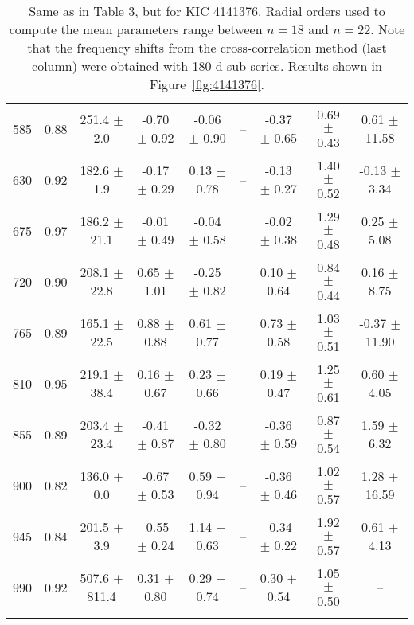 \documentclass[twocolumn]{aastex61}%
\begin{document}
\begin{table*}[ht]
\begin{tabular}{ccc|ccccc|c}
585 & 0.88 & 251.4 $\pm$ 2.0 & -0.70 $\pm$ 0.92 & -0.06 $\pm$ 0.90 & -- & -0.37 $\pm$ 0.65 & 0.69 $\pm$ 0.43 & 0.61 $\pm$ 11.58\\
630 & 0.92 & 182.6 $\pm$ 1.9 & -0.17 $\pm$ 0.29 & 0.13 $\pm$ 0.78 & -- & -0.13 $\pm$ 0.27 & 1.40 $\pm$ 0.52 & -0.13 $\pm$ 3.34\\
675 & 0.97 & 186.2 $\pm$ 21.1 & -0.01 $\pm$ 0.49 & -0.04 $\pm$ 0.58 & -- & -0.02 $\pm$ 0.38 & 1.29 $\pm$ 0.48 & 0.25 $\pm$ 5.08\\
720 & 0.90 & 208.1 $\pm$ 22.8 & 0.65 $\pm$ 1.01 & -0.25 $\pm$ 0.82 & -- & 0.10 $\pm$ 0.64 & 0.84 $\pm$ 0.44 & 0.16 $\pm$ 8.75\\
765 & 0.89 & 165.1 $\pm$ 22.5 & 0.88 $\pm$ 0.88 & 0.61 $\pm$ 0.77 & -- & 0.73 $\pm$ 0.58 & 1.03 $\pm$ 0.51 & -0.37 $\pm$ 11.90\\
810 & 0.95 & 219.1 $\pm$ 38.4 & 0.16 $\pm$ 0.67 & 0.23 $\pm$ 0.66 & -- & 0.19 $\pm$ 0.47 & 1.25 $\pm$ 0.61 & 0.60 $\pm$ 4.05\\
855 & 0.89 & 203.4 $\pm$ 23.4 & -0.41 $\pm$ 0.87 & -0.32 $\pm$ 0.80 & -- & -0.36 $\pm$ 0.59 & 0.87 $\pm$ 0.54 & 1.59 $\pm$ 6.32\\
900 & 0.82 & 136.0 $\pm$ 0.0 & -0.67 $\pm$ 0.53 & 0.59 $\pm$ 0.94 & -- & -0.36 $\pm$ 0.46 & 1.02 $\pm$ 0.57 & 1.28 $\pm$ 16.59\\
945 & 0.84 & 201.5 $\pm$ 3.9 & -0.55 $\pm$ 0.24 & 1.14 $\pm$ 0.63 & -- & -0.34 $\pm$ 0.22 & 1.92 $\pm$ 0.57 & 0.61 $\pm$ 4.13\\
990 & 0.92 & 507.6 $\pm$ 811.4 & 0.31 $\pm$ 0.80 & 0.29 $\pm$ 0.74 & -- & 0.30 $\pm$ 0.54 & 1.05 $\pm$ 0.50 & --\\\vspace{-0.35cm}
\end{tabular}
\caption{Same as in Table 3, but for KIC 4141376. {Radial orders used to compute the mean parameters range between $n=18$ and $n=22$.} Note that the frequency shifts from the cross-correlation method (last column) were obtained with 180-d sub-series. Results shown in Figure~\ref{fig:4141376}.}\label{tab:4141376}\vspace{-1.cm}
\end{table*}
\end{document}
